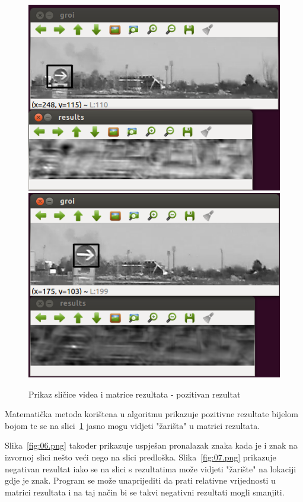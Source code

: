 \begin{figure}[!htb]
    \includegraphics[width=\linewidth]{figures/04.png}
\endminipage\hfill
{}
    \includegraphics[width=\linewidth]{figures/05.png}
\endminipage\hfill
\caption{Prikaz sličice videa i matrice rezultata - pozitivan rezultat}
\label{fig:04.png}
\end{figure}

Matematička metoda korištena u algoritmu prikazuje pozitivne rezultate
bijelom bojom te se na slici~\ref{fig:04.png} jasno mogu vidjeti
"žarišta" u matrici rezultata.

\newpage

Slika~\ref{fig:06.png} također prikazuje uspješan pronalazak znaka kada
je i znak na izvornoj slici nešto veći nego na slici predloška.
Slika~\ref{fig:07.png} prikazuje negativan rezultat iako se na slici s
rezultatima može vidjeti "žarište" na lokaciji gdje je znak. Program se
može unaprijediti da prati relativne vrijednosti u matrici rezultata i
na taj način bi se takvi negativni rezultati mogli smanjiti.

